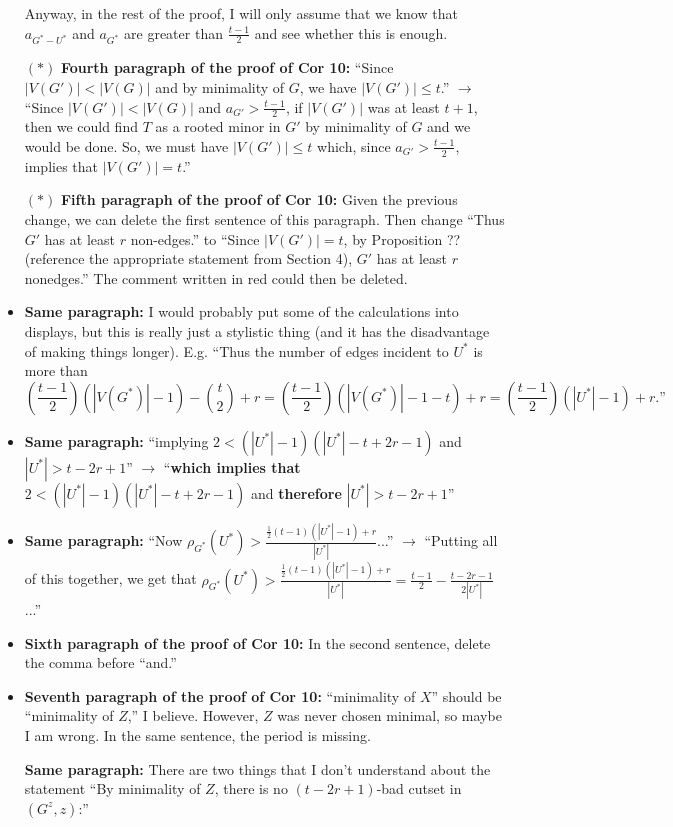 \documentclass[11 pt]{article}
\begin{document}
\begin{itemize}
Anyway, in the rest of the proof, I will only assume that we know that $a_{G^*-U^*}$ and $a_{G^*}$ are greater than $\frac{t-1}{2}$ and see whether this is enough.
\item[$\boldsymbol{(*)}$] \textbf{Fourth paragraph of the proof of Cor 10:} ``Since $|V(G')|<|V(G)|$ and by minimality of $G$, we have $|V(G')|\leq t$.'' $\to$ ``Since $|V(G')|<|V(G)|$ and $a_{G'}>\frac{t-1}{2}$, if $|V(G')|$ was at least $t+1$, then we could find $T$ as a rooted minor in $G'$ by minimality of $G$ and we would be done. So, we must have $|V(G')|\leq t$ which, since $a_{G'}>\frac{t-1}{2}$,  implies that $|V(G')|=t$.''
\item[$\boldsymbol{(*)}$] \textbf{Fifth paragraph of the proof of Cor 10:} Given the previous change, we can delete the first sentence of this paragraph. Then change ``Thus $G'$ has at least $r$ non-edges.'' to ``Since $|V(G')|=t$, by Proposition ?? (reference the appropriate statement from Section 4), $G'$ has at least $r$ nonedges.'' The comment written in red could then be deleted. 
\item \textbf{Same paragraph:} I would probably put some of the calculations into displays, but this is really just a stylistic thing (and it has the disadvantage of making things longer). E.g. ``Thus the number of edges incident to $U^*$ is more than
\[\left(\frac{t-1}{2}\right)(|V(G^*)|-1)-\binom{t}{2} + r = \left(\frac{t-1}{2}\right)(|V(G^*)|-1-t)+r = \left(\frac{t-1}{2}\right)(|U^*|-1)+r.\text{''}\]
\item \textbf{Same paragraph:} ``implying $2<(|U^*|-1)(|U^*|-t+2r-1)$ and $|U^*| > t-2r+1$'' $\to$ ``\textbf{which implies that} $2<(|U^*|-1)(|U^*|-t+2r-1)$ and \textbf{therefore} $|U^*| > t-2r+1$''
\item \textbf{Same paragraph:} ``Now $\rho_{G^*}(U^*)>\frac{\frac{1}{2}(t-1)(|U^*|-1)+r}{|U^*|}$...'' $\to$ ``Putting all of this together, we get that $\rho_{G^*}(U^*)>\frac{\frac{1}{2}(t-1)(|U^*|-1)+r}{|U^*|} = \frac{t-1}{2}  - \frac{t-2r-1}{2|U^*|}$...''
\item \textbf{Sixth paragraph of the proof of Cor 10:} In the second sentence, delete the comma before ``and.''
\item \textbf{Seventh paragraph of the proof of Cor 10:} ``minimality of $X$'' should be ``minimality of $Z$,'' I believe. However, $Z$ was never chosen minimal, so maybe I am wrong. In the same sentence, the period is missing. 
\item[\color{red}{$\boldsymbol{(**)}$}] \textbf{Same paragraph:} There are two things that I don't understand about the statement ``By minimality of $Z$, there is no $(t-2r+1)$-bad cutset in $(G^z,z)$:''

\end{itemize}
\end{document}
